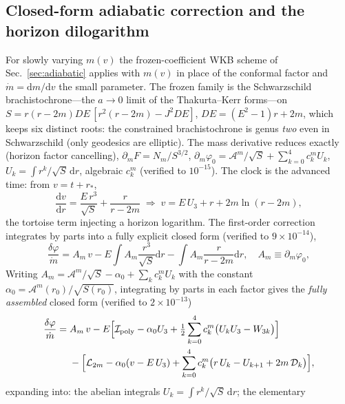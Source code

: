 \documentclass[
    aps, prd, twocolumn, superscriptaddress,
    showpacs, nofootinbib, floatfix
]{revtex4-2}
\newcommand{\dd}{\mathrm{d}}
\begin{document}
\subsection{Closed-form adiabatic correction and the horizon dilogarithm}
\label{sec:vaidya-adiabatic}
For slowly varying $m(v)$ the frozen-coefficient WKB scheme of
Sec.~\ref{sec:adiabatic} applies with $m(v)$ in place of the conformal factor and
$\dot m=\dd m/\dd v$ the small parameter. The frozen family is the Schwarzschild
brachistochrone---the $a\to0$ limit of the Thakurta--Kerr forms---on
$S=r(r-2m)DE\,[r^2(r-2m)-J^2 DE]$, $DE=(E^2-1)r+2m$, which keeps six distinct roots:
the constrained brachistochrone is genus \emph{two} even in Schwarzschild (only
geodesics are elliptic). The mass derivative reduces exactly (horizon factor
cancelling), $\partial_m F=N_m/S^{3/2}$,
$\partial_m\varphi_0=\mathcal{A}^m/\sqrt S+\sum_{k=0}^4 c_k^m U_k$, $U_k=\int
r^k/\sqrt S\,\dd r$, algebraic $c_k^m$ (verified to $10^{-15}$). The clock is the
advanced time: from $v=t+r_*$,
\begin{equation}
    \frac{\dd v}{\dd r}=\frac{E\,r^3}{\sqrt S}+\frac{r}{r-2m}
    \;\Rightarrow\; v=E\,U_3+r+2m\ln(r-2m),
    \label{eq:vaidya-clock}
\end{equation}
the tortoise term injecting a horizon logarithm. The first-order correction
integrates by parts into a fully explicit closed form (verified to
$9\times10^{-14}$),
\begin{equation}
    \frac{\delta\varphi}{\dot m}=A_m\,v-E\!\int\! A_m\frac{r^3}{\sqrt S}\dd r
    -\int\! A_m\frac{r}{r-2m}\dd r,\quad A_m\equiv\partial_m\varphi_0,
    \label{eq:vaidya-deltaphi}
\end{equation}
Writing $A_m=\mathcal{A}^m/\sqrt S-\alpha_0+\sum_k c_k^m U_k$ with the constant
$\alpha_0=\mathcal{A}^m(r_0)/\sqrt{S(r_0)}$, integrating by parts in each factor
gives the \emph{fully assembled} closed form (verified to $2\times10^{-13}$)
\begin{equation}
\begin{aligned}
    \frac{\delta\varphi}{\dot m}
    ={}&A_m\,v
    -E\Big[\mathcal{I}_{\rm poly}-\alpha_0 U_3
        +\tfrac12\sum_{k=0}^4 c_k^m\big(U_kU_3-W_{3k}\big)\Big]\\
    &{}-\Big[\mathcal{L}_{2m}-\alpha_0(v-E\,U_3)
        +\sum_{k=0}^4 c_k^m\big(r\,U_k-U_{k+1}+2m\,\mathcal{D}_k\big)\Big],
\end{aligned}
    \label{eq:vaidya-full}
\end{equation}
expanding into: the abelian integrals $U_k=\int r^k/\sqrt S\,\dd r$; the elementary
\end{document}
